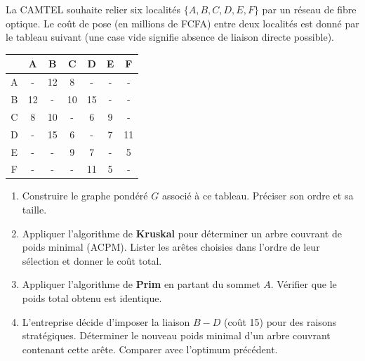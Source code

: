 \documentclass[11pt]{article}
\begin{document}
\begin{exercice}
La CAMTEL souhaite relier six localités $\{A, B, C, D, E, F\}$ par un réseau de fibre optique. Le coût de pose (en millions de FCFA) entre deux localités est donné par le tableau suivant (une case vide signifie absence de liaison directe possible).

\begin{center}
\begin{tabular}{|c|c|c|c|c|c|c|}
\hline
& A & B & C & D & E & F \\ \hline
A & - & 12 & 8 & - & - & - \\ \hline
B & 12 & - & 10 & 15 & - & - \\ \hline
C & 8 & 10 & - & 6 & 9 & - \\ \hline
D & - & 15 & 6 & - & 7 & 11 \\ \hline
E & - & - & 9 & 7 & - & 5 \\ \hline
F & - & - & - & 11 & 5 & - \\ \hline
\end{tabular}
\end{center}
\begin{enumerate}
\item Construire le graphe pondéré $G$ associé à ce tableau. Préciser son ordre et sa taille.
\item Appliquer l'algorithme de \textbf{Kruskal} pour déterminer un arbre couvrant de poids minimal (ACPM). Lister les arêtes choisies dans l'ordre de leur sélection et donner le coût total.
\item Appliquer l'algorithme de \textbf{Prim} en partant du sommet $A$. Vérifier que le poids total obtenu est identique.
\item L'entreprise décide d'imposer la liaison $B-D$ (coût 15) pour des raisons stratégiques. Déterminer le nouveau poids minimal d'un arbre couvrant contenant cette arête. Comparer avec l'optimum précédent.
\end{enumerate}
\end{exercice}
\end{document}
